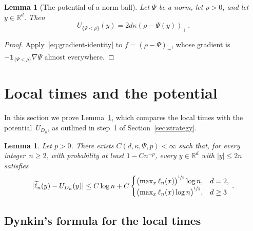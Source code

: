 \documentclass[11pt]{amsart}
\theoremstyle{plain}
\newtheorem{lemma}[theorem]{Lemma}
\theoremstyle{definition}
\newcommand{\R}{\mathbb R}
\newcommand{\drift}{\kappa}
\newcommand{\gauge}{\Psi}
\newcommand{\ind}{\mathbf 1}
\newcommand{\nf}{\nicefrac}
\numberwithin{equation}{section}
\begin{document}
\begin{lemma}[The potential of a norm ball]\label{lem:ballpotential}
Let $\gauge$ be a norm, let $\rho>0$, and let $y\in\R^d$. Then
\begin{equation}\label{eq:ballpotential}
U_{\{\gauge<\rho\}}(y)=2d\drift(\rho-\gauge(y))_+\, .
\end{equation}
\end{lemma}

\begin{proof}
Apply~\eqref{eq:gradient-identity} to $f=(\rho-\gauge)_+$, whose gradient is $-\ind_{\{\gauge<\rho\}}\nabla\gauge$ almost everywhere.
\end{proof}

\section{Local times and the potential}\label{sec:local}

In this section we prove Lemma~\ref{lem:local}, which compares the local times with the potential~$U_{D_n}$, as outlined in step~1 of Section~\ref{sec:strategy}.

\begin{lemma}\label{lem:local}
Let $p>0$. There exists $C(d,\drift,\gauge,p)<\infty$ such that, for every integer~$n\geq2$, with probability at least $1-Cn^{-p}$, every $y\in\R^d$ with $|y|\leq2n$ satisfies
\begin{equation}\label{eq:approx}
|\widetilde\ell_n(y)-U_{D_n}(y)|\leq C\log n+C\begin{cases}\bigl(\max_x\ell_n(x)\bigr)^{\nf12}\log n,&d=2,\\\bigl(\max_x\ell_n(x)\log n\bigr)^{\nf12},&d\geq3\end{cases}\, .
\end{equation}
\end{lemma}

\subsection{Dynkin's formula for the local times}\label{sec:dynkin}
\end{document}
